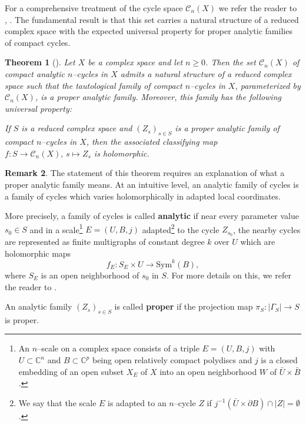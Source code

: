 \documentclass[11pt,a4paper]{article}
\newtheorem{theorem}{Theorem}[section]
\theoremstyle{definition}
\newtheorem{rem}[theorem]{Remark}
\newcommand{\cC}{\mathcal{C}}
\newcommand{\bC}{\mathbb{C}}
\begin{document}
For a comprehensive treatment of the cycle space $\cC_n(X)$ we refer the reader to \cite{BarletMagnusson2019CyclesI}, \cite{BarletMagnusson2025CyclesII}. The fundamental result is that this set carries a natural structure of a reduced complex space with the expected universal property for proper analytic families of compact cycles.

\begin{theorem}[{\cite[Theorem 4.6.1]{BarletMagnusson2019CyclesI}}]
  Let $X$ be a complex space and let $n \geq 0$. Then the set $\cC_n(X)$ of compact analytic $n$--cycles in $X$ admits a natural structure of a reduced complex space such that the tautological family of compact $n$--cycles in $X$, parameterized by $\cC_n(X)$, is a proper analytic family. Moreover, this family has the following universal property:
  
  If $S$ is a reduced complex space and $(Z_s)_{s \in S}$ is a proper analytic family of compact $n$--cycles in $X$, then the associated classifying map $f: S \rightarrow \cC_n(X),\, s \mapsto Z_s $ is holomorphic.
\end{theorem}

\begin{rem}
  The statement of this theorem requires an explanation of what a proper analytic family means. At an intuitive level, an analytic family of cycles is a family of cycles which varies holomorphically in adapted local coordinates.

  More precisely, a family of cycles is called \textbf{analytic} if near every parameter value $s_0 \in S$ and in a scale\footnote{An $n$--scale \cite[Definition 4.2.1]{BarletMagnusson2019CyclesI} on a complex space consists of a triple $E=(U, B, j)$ with $U \subset \bC^n$ and $B \subset \bC^p$ being open relatively compact polydiscs and $j$ is a closed embedding of an open subset $X_E$ of $X$ into an open neighborhood $W$ of $\bar{U}\times \bar{B}$.} $E=(U, B, j)$ adapted\footnote{We say that the scale $E$ is adapted \cite[Definition 4.2.2]{BarletMagnusson2019CyclesI} to an $n$--cycle $Z$ if $j^{-1}(\bar{U} \times \partial B) \cap |Z| = \emptyset$.} to the cycle $Z_{s_0}$, the nearby cycles are represented as finite multigraphs of constant degree $k$ over $U$ which are holomorphic maps
  \begin{equation*}
    f_E: S_E \times U \to \mathrm{Sym}^k(B),
  \end{equation*}
  where $S_E$ is an open neighborhood of $s_0$ in $S$. For more details on this, we refer the reader to \cite[Definition 4.3.1]{BarletMagnusson2019CyclesI}.

  An analytic family $(Z_s)_{s\in S}$ is called \textbf{proper} if the projection map $\pi_S: |\Gamma_S| \to S$ is proper. 
\end{rem}
\end{document}
